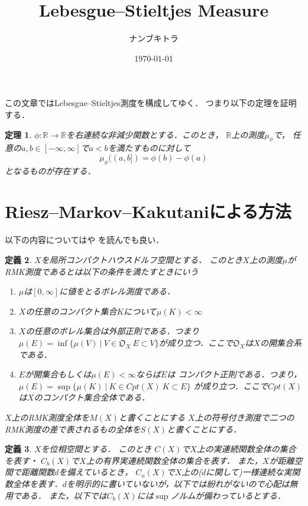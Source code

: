 \documentclass[leqno, a4paper, 12pt]{jsarticle}
\title{Lebesgue--Stieltjes Measure}
\author{ナンブキトラ}
\date{\today}
\newtheorem{thm}{定理}
\newtheorem{df}[thm]{定義}
\newcommand{\rr}{\mathbb{R}}
\begin{document}
\maketitle



この文章ではLebesgue--Stieltjes測度を構成してゆく．
つまり以下の定理を証明する．
\begin{thm}
$\phi:\rr\to \rr$を右連続な非減少関数とする．このとき，
$\rr$上の測度$\mu_{\phi}$で，
任意の$a, b\in [-\infty, \infty]$で$a<b$を満たすものに対して
\[
\mu_{\phi}((a, b])=\phi(b)-\phi(a)
\]
となるものが存在する．
\end{thm}


\section{Riesz--Markov--Kakutaniによる方法}

以下の内容については\cite{RMK1}や
\cite{RMK2}を読んでも良い．

\begin{df}
$X$を局所コンパクトハウスドルフ空間とする．
このとき$X$上の測度$\mu$がRMK測度であるとは以下の条件を満たすときにいう
\begin{enumerate}
\item $\mu$は$[0, \infty]$に値をとるボレル測度である．
\item $X$の任意のコンパクト集合$K$について$\mu(K)<\infty$
\item $X$の任意のボレル集合は外部正則である．つまり
$\mu(E)=\inf\{\mu(V)\ |\ V\in \mathfrak{O}_X\ E\subset V\}$が成り立つ．ここで$\mathfrak{O}_X$は$X$の開集合系である．
\item $E$が開集合もしくは$\mu(E)<\infty$ならば$E$は
コンパクト正則である．つまり，
$\mu(E)=\sup\{\mu(K)\ |\ K\in Cpt(X) \ K\subset E\}$
が成り立つ．ここで$Cpt(X)$は$X$のコンパクト集合全体である．
\end{enumerate}

$X$上のRMK測度全体を$M(X)$と書くことにする
$X$上の符号付き測度で二つのRMK測度の差で表されるもの全体を$S(X)$と書くことにする．
\end{df}


\begin{df}
$X$を位相空間とする．
このとき
$C(X)$で$X$上の実連続関数全体の集合を表す・
$C_{b}(X)$で$X$上の有界実連続関数全体の集合を表す．
また，$X$が距離空間で距離関数$d$を備えているとき，
$C_{u}(X)$で$X$上の($d$に関して)一様連続な実関数全体を表す．$d$を明示的に書いていないが，以下では紛れがないので心配は無用である．
また，以下では$C_{b}(X)$には$\sup$ノルムが備わっているとする．
\end{df}
\end{document}
